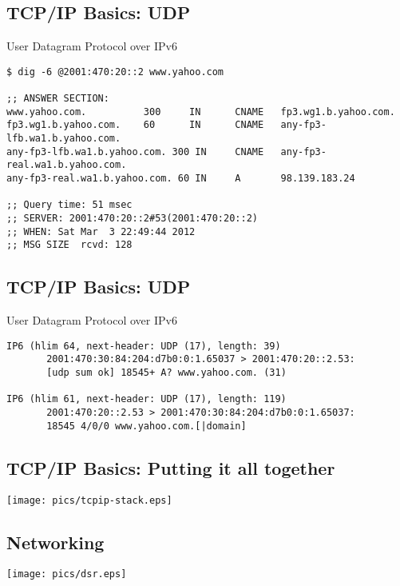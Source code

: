 \documentclass[xga]{xdvislides}
\begin{document}
\subsection{TCP/IP Basics: UDP}
\begin{center}
User Datagram Protocol over IPv6
\end{center}
\vspace{.2in}
\begin{verbatim}
$ dig -6 @2001:470:20::2 www.yahoo.com

;; ANSWER SECTION:
www.yahoo.com.          300     IN      CNAME   fp3.wg1.b.yahoo.com.
fp3.wg1.b.yahoo.com.    60      IN      CNAME   any-fp3-lfb.wa1.b.yahoo.com.
any-fp3-lfb.wa1.b.yahoo.com. 300 IN     CNAME   any-fp3-real.wa1.b.yahoo.com.
any-fp3-real.wa1.b.yahoo.com. 60 IN     A       98.139.183.24

;; Query time: 51 msec
;; SERVER: 2001:470:20::2#53(2001:470:20::2)
;; WHEN: Sat Mar  3 22:49:44 2012
;; MSG SIZE  rcvd: 128

\end{verbatim}

\subsection{TCP/IP Basics: UDP}
\begin{center}
User Datagram Protocol over IPv6
\end{center}
\vspace{.2in}
\begin{verbatim}
IP6 (hlim 64, next-header: UDP (17), length: 39)
       2001:470:30:84:204:d7b0:0:1.65037 > 2001:470:20::2.53:
       [udp sum ok] 18545+ A? www.yahoo.com. (31)

IP6 (hlim 61, next-header: UDP (17), length: 119)
       2001:470:20::2.53 > 2001:470:30:84:204:d7b0:0:1.65037:
       18545 4/0/0 www.yahoo.com.[|domain]

\end{verbatim}

\subsection{TCP/IP Basics: Putting it all together}
\vspace*{\fill}
\begin{center}
	\texttt{[image: pics/tcpip-stack.eps]}
\end{center}
\vspace*{\fill}

\subsection{Networking}
\vspace*{\fill}
\begin{center}
	\texttt{[image: pics/dsr.eps]} \\
\end{center}
\vspace*{\fill}
\end{document}
